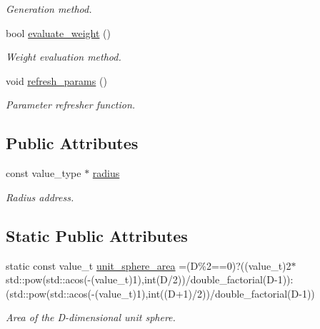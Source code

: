 \begin{DoxyCompactItemize}
\begin{DoxyCompactList}\small\item\em Generation method. \end{DoxyCompactList}\item 
\hypertarget{a00549_ae516b42f3f00e0fff703e9e9804ba846}{bool \hyperlink{a00549_ae516b42f3f00e0fff703e9e9804ba846}{evaluate\-\_\-weight} ()}\label{a00549_ae516b42f3f00e0fff703e9e9804ba846}

\begin{DoxyCompactList}\small\item\em Weight evaluation method. \end{DoxyCompactList}\item 
\hypertarget{a00549_a1529ff9a6ade83f812e5f352d82ac40f}{void \hyperlink{a00549_a1529ff9a6ade83f812e5f352d82ac40f}{refresh\-\_\-params} ()}\label{a00549_a1529ff9a6ade83f812e5f352d82ac40f}

\begin{DoxyCompactList}\small\item\em Parameter refresher function. \end{DoxyCompactList}\end{DoxyCompactItemize}
\subsection*{Public Attributes}
\begin{DoxyCompactItemize}
\item 
\hypertarget{a00549_a6bf77d5905741c78b3337c17f617f731}{const value\-\_\-type $\ast$ \hyperlink{a00549_a6bf77d5905741c78b3337c17f617f731}{radius}}\label{a00549_a6bf77d5905741c78b3337c17f617f731}

\begin{DoxyCompactList}\small\item\em Radius address. \end{DoxyCompactList}\end{DoxyCompactItemize}
\subsection*{Static Public Attributes}
\begin{DoxyCompactItemize}
\item 
\hypertarget{a00549_a93682440646ecd7e6caaf4f6951f65ac}{static const value\-\_\-t \hyperlink{a00549_a93682440646ecd7e6caaf4f6951f65ac}{unit\-\_\-sphere\-\_\-area} =(D\%2==0)?((value\-\_\-t)2$\ast$std\-::pow(std\-::acos(-\/(value\-\_\-t)1),int(D/2))/double\-\_\-factorial(D-\/1))\-:(std\-::pow(std\-::acos(-\/(value\-\_\-t)1),int((D+1)/2))/double\-\_\-factorial(D-\/1))}\label{a00549_a93682440646ecd7e6caaf4f6951f65ac}

\begin{DoxyCompactList}\small\item\em Area of the D-\/dimensional unit sphere. \end{DoxyCompactList}\end{DoxyCompactItemize}


